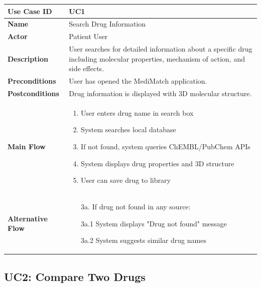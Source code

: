 \documentclass[12pt,a4paper]{report}
\begin{document}
\begin{tabularx}{\textwidth}{|l|X|}
\hline
\textbf{Use Case ID} & UC1 \\
\hline
\textbf{Name} & Search Drug Information \\
\hline
\textbf{Actor} & Patient User \\
\hline
\textbf{Description} & User searches for detailed information about a specific drug including molecular properties, mechanism of action, and side effects. \\
\hline
\textbf{Preconditions} & User has opened the MediMatch application. \\
\hline
\textbf{Postconditions} & Drug information is displayed with 3D molecular structure. \\
\hline
\textbf{Main Flow} & 
\begin{enumerate}[nosep]
    \item User enters drug name in search box
    \item System searches local database
    \item If not found, system queries ChEMBL/PubChem APIs
    \item System displays drug properties and 3D structure
    \item User can save drug to library
\end{enumerate} \\
\hline
\textbf{Alternative Flow} & 
\begin{enumerate}[nosep]
    \item[3a.] If drug not found in any source:
    \item[3a.1] System displays "Drug not found" message
    \item[3a.2] System suggests similar drug names
\end{enumerate} \\
\hline
\end{tabularx}

\subsection{UC2: Compare Two Drugs}
\end{document}
